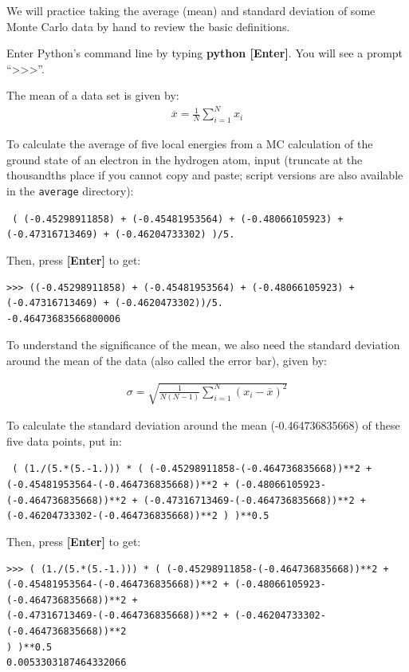 We will practice taking the average (mean) and standard deviation of some Monte
Carlo data by hand to review the basic definitions.

Enter Python's command line by typing \textbf{python [Enter]}.
You will see a prompt ``\textgreater\textgreater\textgreater''.

The mean of a data set is given by:
\begin{align}
  \overline{x} = \frac{1}{N}\sum_{i=1}^{N} x_i
\end{align}

To calculate the average of five local energies from a MC calculation of the
ground state of an electron in the hydrogen atom, input (truncate at the
thousandths place if you cannot copy and paste; script versions are also
available in the \texttt{average} directory): 

\texttt{
(
(-0.45298911858) + 
(-0.45481953564) + 
(-0.48066105923) + 
(-0.47316713469) + 
(-0.46204733302)
)/5.
} 

Then, press \textbf{[Enter]} to get:

\begin{shaded} 
\begin{verbatim}
>>> ((-0.45298911858) + (-0.45481953564) + (-0.48066105923) + 
(-0.47316713469) + (-0.4620473302))/5.  
-0.46473683566800006
\end{verbatim}
\end{shaded}

To understand the significance of the mean, we also need the standard deviation
around the mean of the data (also called the error bar), given by:

\begin{align}
  \sigma = \sqrt{\frac{1}{N(N-1)}\sum_{i=1}^{N} ({x_i} - \overline{x})^2}
\end{align}

To calculate the standard deviation around the mean (-0.464736835668) of these
five data points, put in: 

\texttt{
( (1./(5.*(5.-1.))) * ( 
(-0.45298911858-(-0.464736835668))**2 + \\
(-0.45481953564-(-0.464736835668))**2 + 
(-0.48066105923-(-0.464736835668))**2 + 
(-0.47316713469-(-0.464736835668))**2 + 
(-0.46204733302-(-0.464736835668))**2 ) 
)**0.5
} 

Then, press \textbf{[Enter]} to get:

\begin{shaded}
\begin{verbatim}
>>> ( (1./(5.*(5.-1.))) * ( (-0.45298911858-(-0.464736835668))**2 +
(-0.45481953564-(-0.464736835668))**2 + (-0.48066105923-(-0.464736835668))**2 + 
(-0.47316713469-(-0.464736835668))**2 + (-0.46204733302-(-0.464736835668))**2 
) )**0.5
0.0053303187464332066
\end{verbatim}
\end{shaded}


